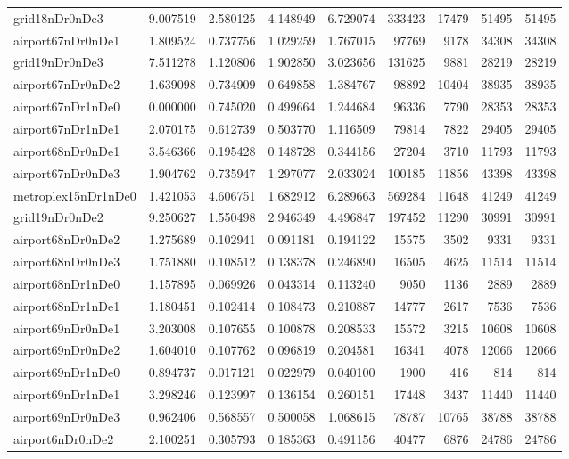 \begin{longtable}{|l|r|r|r|r|r|r|r|r|}
grid18nDr0nDe3 & 9.007519 & 2.580125 & 4.148949 & 6.729074 & 333423 & 17479 & 51495 & 51495 \\
airport67nDr0nDe1 & 1.809524 & 0.737756 & 1.029259 & 1.767015 & 97769 & 9178 & 34308 & 34308 \\
grid19nDr0nDe3 & 7.511278 & 1.120806 & 1.902850 & 3.023656 & 131625 & 9881 & 28219 & 28219 \\
airport67nDr0nDe2 & 1.639098 & 0.734909 & 0.649858 & 1.384767 & 98892 & 10404 & 38935 & 38935 \\
airport67nDr1nDe0 & 0.000000 & 0.745020 & 0.499664 & 1.244684 & 96336 & 7790 & 28353 & 28353 \\
airport67nDr1nDe1 & 2.070175 & 0.612739 & 0.503770 & 1.116509 & 79814 & 7822 & 29405 & 29405 \\
airport68nDr0nDe1 & 3.546366 & 0.195428 & 0.148728 & 0.344156 & 27204 & 3710 & 11793 & 11793 \\
airport67nDr0nDe3 & 1.904762 & 0.735947 & 1.297077 & 2.033024 & 100185 & 11856 & 43398 & 43398 \\
metroplex15nDr1nDe0 & 1.421053 & 4.606751 & 1.682912 & 6.289663 & 569284 & 11648 & 41249 & 41249 \\
grid19nDr0nDe2 & 9.250627 & 1.550498 & 2.946349 & 4.496847 & 197452 & 11290 & 30991 & 30991 \\
airport68nDr0nDe2 & 1.275689 & 0.102941 & 0.091181 & 0.194122 & 15575 & 3502 & 9331 & 9331 \\
airport68nDr0nDe3 & 1.751880 & 0.108512 & 0.138378 & 0.246890 & 16505 & 4625 & 11514 & 11514 \\
airport68nDr1nDe0 & 1.157895 & 0.069926 & 0.043314 & 0.113240 & 9050 & 1136 & 2889 & 2889 \\
airport68nDr1nDe1 & 1.180451 & 0.102414 & 0.108473 & 0.210887 & 14777 & 2617 & 7536 & 7536 \\
airport69nDr0nDe1 & 3.203008 & 0.107655 & 0.100878 & 0.208533 & 15572 & 3215 & 10608 & 10608 \\
airport69nDr0nDe2 & 1.604010 & 0.107762 & 0.096819 & 0.204581 & 16341 & 4078 & 12066 & 12066 \\
airport69nDr1nDe0 & 0.894737 & 0.017121 & 0.022979 & 0.040100 & 1900 & 416 & 814 & 814 \\
airport69nDr1nDe1 & 3.298246 & 0.123997 & 0.136154 & 0.260151 & 17448 & 3437 & 11440 & 11440 \\
airport69nDr0nDe3 & 0.962406 & 0.568557 & 0.500058 & 1.068615 & 78787 & 10765 & 38788 & 38788 \\
airport6nDr0nDe2 & 2.100251 & 0.305793 & 0.185363 & 0.491156 & 40477 & 6876 & 24786 & 24786 \\

\end{longtable}
